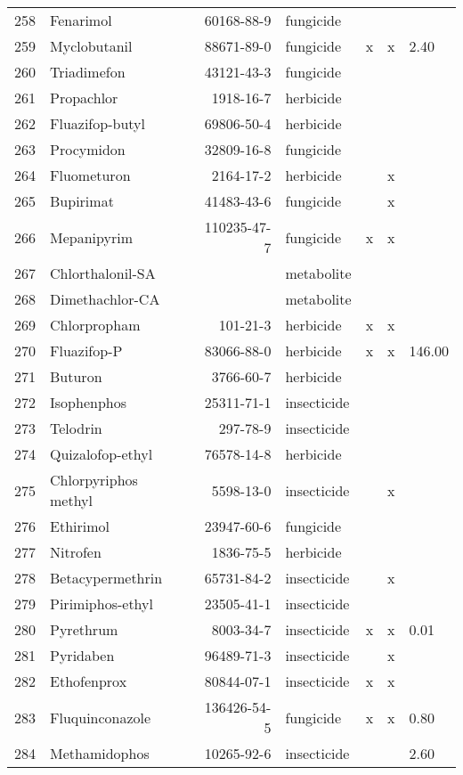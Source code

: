\begin{longtable}{lp{3cm}rlp{0.5cm}p{0.5cm}p{1cm}}
  258 & Fenarimol & 60168-88-9 & fungicide &  &  &  \\ 
  259 & Myclobutanil & 88671-89-0 & fungicide & x & x & 2.40 \\ 
  260 & Triadimefon & 43121-43-3 & fungicide &  &  &  \\ 
  261 & Propachlor & 1918-16-7 & herbicide &  &  &  \\ 
  262 & Fluazifop-butyl & 69806-50-4 & herbicide &  &  &  \\ 
  263 & Procymidon & 32809-16-8 & fungicide &  &  &  \\ 
  264 & Fluometuron & 2164-17-2 & herbicide &  & x &  \\ 
  265 & Bupirimat & 41483-43-6 & fungicide &  & x &  \\ 
  266 & Mepanipyrim & 110235-47-7 & fungicide & x & x &  \\ 
  267 & Chlorthalonil-SA &  & metabolite &  &  &  \\ 
  268 & Dimethachlor-CA &  & metabolite &  &  &  \\ 
  269 & Chlorpropham & 101-21-3 & herbicide & x & x &  \\ 
  270 & Fluazifop-P & 83066-88-0 & herbicide & x & x & 146.00 \\ 
  271 & Buturon & 3766-60-7 & herbicide &  &  &  \\ 
  272 & Isophenphos & 25311-71-1 & insecticide &  &  &  \\ 
  273 & Telodrin & 297-78-9 & insecticide &  &  &  \\ 
  274 & Quizalofop-ethyl & 76578-14-8 & herbicide &  &  &  \\ 
  275 & Chlorpyriphos methyl & 5598-13-0 & insecticide &  & x &  \\ 
  276 & Ethirimol & 23947-60-6 & fungicide &  &  &  \\ 
  277 & Nitrofen & 1836-75-5 & herbicide &  &  &  \\ 
  278 & Betacypermethrin & 65731-84-2 & insecticide &  & x &  \\ 
  279 & Pirimiphos-ethyl & 23505-41-1 & insecticide &  &  &  \\ 
  280 & Pyrethrum & 8003-34-7 & insecticide & x & x & 0.01 \\ 
  281 & Pyridaben & 96489-71-3 & insecticide &  & x &  \\ 
  282 & Ethofenprox & 80844-07-1 & insecticide & x & x &  \\ 
  283 & Fluquinconazole & 136426-54-5 & fungicide & x & x & 0.80 \\ 
  284 & Methamidophos & 10265-92-6 & insecticide &  &  & 2.60 \\ 

\end{longtable}
